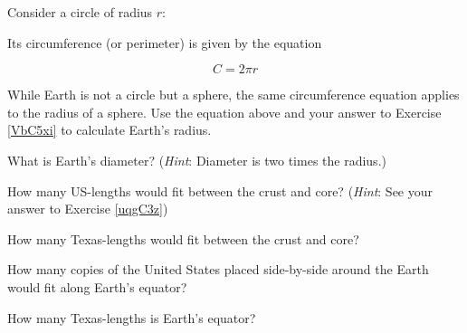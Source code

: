 \documentclass{article}
\numberwithin{equation}{section}
\numberwithin{figure}{section}
\begin{document}
\begin{exercise}
Consider a circle of radius $r$:

\begin{center}
\end{center}

Its circumference (or perimeter) is given by the equation

\begin{equation*}
    C = 2\pi r
\end{equation*}

While Earth is not a circle but a sphere, the same circumference equation applies to the radius of a sphere. Use the equation above and your answer to Exercise \ref{VbC5xi} to calculate Earth's radius.

\end{exercise}


\begin{exercise}
    What is Earth's diameter? (\textit{Hint}: Diameter is two times the radius.)
\end{exercise}

\begin{exercise} 
    How many US-lengths would fit between the crust and core? (\textit{Hint}: See your answer to Exercise \ref{uqgC3z})
\end{exercise}

\begin{exercise}
    How many Texas-lengths would fit between the crust and core?
\end{exercise}

\begin{exercise}
    How many copies of the United States placed side-by-side around the Earth would fit along Earth's equator?
\end{exercise}

\begin{exercise}
    How many Texas-lengths is Earth's equator?
\end{exercise}
\end{document}
